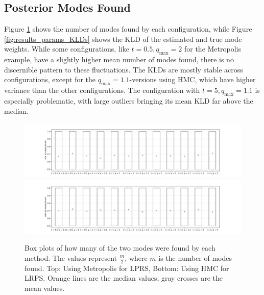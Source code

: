 \documentclass[12pt, a4paper]{report}
\begin{document}
\subsection{Posterior Modes Found}
Figure \ref{fig:results_params_modes_found} shows the number of modes found by each configuration, while Figure \ref{fig:results_params_KLDs} shows the KLD of the estimated and true mode weights.
While some configurations, like $t = 0.5, q_{\textrm{max}} = 2$ for the Metropolis example, have a slightly higher mean number of modes found, there is no discernible pattern to these fluctuations.
The KLDs are mostly stable across configurations, except for the $q_{\textrm{max}} = 1.1$-versions using HMC, which have higher variance than the other configurations.
The configuration with $t = 5, q_{\textrm{max}} = 1.1$ is especially problematic, with large outliers bringing its mean KLD far above the median.
\begin{figure}
    \centering
    \includegraphics[trim={3cm 0cm 3cm 0cm}, clip, width=\textwidth]{figs/results/params/modes_found_metropolis.png}
    \includegraphics[trim={3cm 0cm 3cm 0cm}, clip, width=\textwidth]{figs/results/params/modes_found_hmc.png}
    \caption{Box plots of how many of the two modes were found by each method. The values represent $\frac{m}{2}$, where $m$ is the number of modes found. Top: Using Metropolis for LPRS, Bottom: Using HMC for LRPS. Orange lines are the median values, gray crosses are the mean values.}
    \label{fig:results_params_modes_found}
\end{figure}
\end{document}

